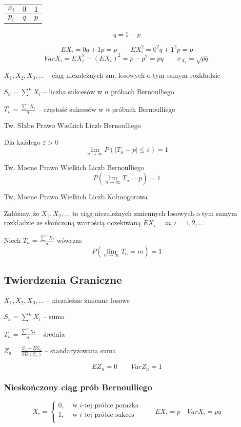 \documentclass[../Matematyka.tex]{subfiles}
\begin{document}
\begin{table}[H]
    \centering
    \begin{tabular}{c|c|c}
        \(x_i\) & \(0\) & \(1\) \\\hline
        \(p_i\) & \(q\) & \(p\)
    \end{tabular}
    \[q = 1 - p\]
\end{table}

\[EX_i = 0q + 1p = p \qquad EX^2_i = 0^2q + 1^2p = p\]
\[VarX_i = EX^2_i - (EX_i)^2 = p - p^2 = pq \qquad \sigma_{X_i} = \sqrt{pq}\]

\(X_1, X_2, X_3, \ldots\) -- ciąg niezależnych zm. losowych o tym samym rozkładzie

\(S_n = \sum^n X_i\) -- liczba sukcesów w \(n\) próbach Bernoulliego

\(T_n = \frac{\sum^n X_i}{n}\) -- częstość sukcesów w \(n\) próbach Bernoulliego

Tw. Słabe Prawo Wielkich Liczb Bernoulliego

Dla każdego \(\varepsilon > 0\)
\[\lim_{n \rightarrow \infty} P(|T_n - p| \leq \varepsilon) = 1\]

Tw. Mocne Prawo Wielkich Liczb Bernoulliego
\[P(\lim_{n\rightarrow\infty} T_n = p) = 1\]

Tw, Mocne Prawo Wielkich Liczb Kołmogorowa

Załóżmy, że \(X_1, X_2, \ldots\) to ciąg niezależnych zmiennych losowych o tym samym rozkładzie ze skończoną wartością oczekiwaną \(EX_i = m, i=1,2,\ldots\)

Niech \(T_n = \frac{\sum^n X_i}{n}\) wówczas
\[P(\lim_{n\rightarrow\infty} T_n = m) = 1\]

\newpage
\subsection{Twierdzenia Graniczne}
\(X_1, X_2, X_3, \ldots\) -- niezależne zmienne losowe

\(S_n = \sum^n X_i\) -- suma

\(T_n = \frac{\sum^n X_i}{n}\) -- średnia

\(Z_n = \frac{S_n - ES_n}{SD(S_n)}\) -- standaryzowana suma

\[EZ_n = 0 \qquad VarZ_n = 1\]

\subsubsection*{Nieskończony ciąg prób Bernoulliego}
\[X_i = \begin{cases}
        0, & \text{ w } i\text{-tej próbie porażka} \\
        1, & \text{ w } i\text{-tej próbie sukces}  \\
    \end{cases} \qquad EX_i = p \quad VarX_i = pq\]
\end{document}
